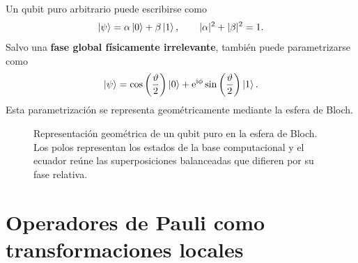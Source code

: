 \documentclass[../main.tex]{subfiles}
\begin{document}
Un qubit puro arbitrario puede escribirse como
\begin{equation*}
    \ket{\psi}=\alpha\ket{0}+\beta\ket{1},
    \qquad
    |\alpha|^2+|\beta|^2=1.
\end{equation*}
Salvo una \textbf{fase global físicamente irrelevante}, también puede parametrizarse como
\begin{equation*}
    \ket{\psi}=\cos\left(\frac{\vartheta}{2}\right)\ket{0}
    +\mathrm{e}^{\mathrm{i}\phi}\sin\left(\frac{\vartheta}{2}\right)\ket{1}.
\end{equation*}
Esta parametrización se representa geométricamente mediante la esfera de Bloch.

\begin{figure}[htbp]
    \centering
    \caption{Representación geométrica de un qubit puro en la esfera de Bloch. Los polos representan los estados de la base computacional y el ecuador reúne las superposiciones balanceadas que difieren por su fase relativa.}
    \label{fig:bloch-qubit}
\end{figure}

\section{Operadores de Pauli como transformaciones locales}
\end{document}
